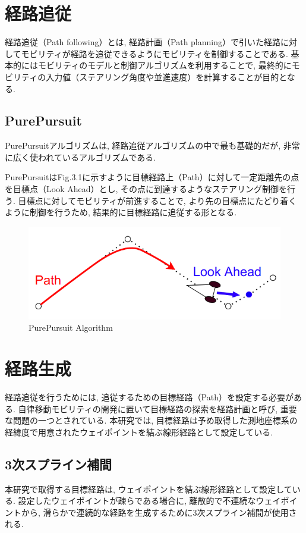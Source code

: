 
\section{経路追従}
経路追従（Path following）とは, 経路計画（Path planning）で引いた経路に対してモビリティが経路を追従できるようにモビリティを制御することである.
基本的にはモビリティのモデルと制御アルゴリズムを利用することで, 最終的にモビリティの入力値（ステアリング角度や並進速度）を計算することが目的となる.

\subsection{PurePursuit}
PurePursuitアルゴリズムは, 経路追従アルゴリズムの中で最も基礎的だが, 非常に広く使われているアルゴリズムである.

PurePursuitはFig.3.1に示すように目標経路上（Path）に対して一定距離先の点を目標点（Look Ahead）とし, その点に到達するようなステアリング制御を行う.
目標点に対してモビリティが前進することで, より先の目標点にたどり着くように制御を行うため, 結果的に目標経路に追従する形となる.

\begin{figure}[H]
  \centering
 \includegraphics[keepaspectratio, scale=0.5]
      {images/PurePursuit.png}
 \caption{PurePursuit Algorithm}
 \label{fig:purepursuit}
\end{figure}

\section{経路生成}
経路追従を行うためには, 追従するための目標経路（Path）を設定する必要がある.
自律移動モビリティの開発に置いて目標経路の探索を経路計画と呼び, 重要な問題の一つとされている.
本研究では, 目標経路は予め取得した測地座標系の経緯度で用意されたウェイポイントを結ぶ線形経路として設定している.


\subsection{3次スプライン補間}
本研究で取得する目標経路は, ウェイポイントを結ぶ線形経路として設定している.
設定したウェイポイントが疎らである場合に, 離散的で不連続なウェイポイントから, 滑らかで連続的な経路を生成するために3次スプライン補間が使用される.

